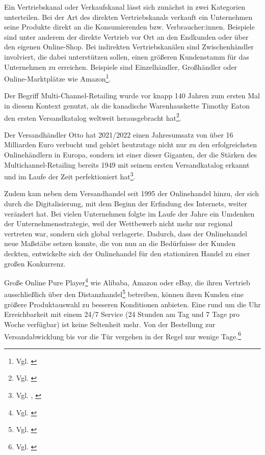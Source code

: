 Ein Vertriebskanal oder Verkaufskanal lässt sich zunächst in zwei Kategorien unterteilen. Bei der Art des direkten Vertriebskanals verkauft ein Unternehmen seine Produkte direkt an die Konsumierenden bzw. Verbraucher:innen. Beispiele sind unter anderem der direkte Vertrieb vor Ort an den Endkunden oder über den eigenen Online-Shop. Bei indirekten Vertriebskanälen sind Zwischenhändler involviert, die dabei unterstützen sollen, einen größeren Kundenstamm für das Unternehmen zu erreichen. Beispiele sind Einzelhändler, Großhändler oder Online-Marktplätze wie Amazon\footnote{Vgl. \autocite [Online] {GisclardBiondi2021}}.
\newline

Der Begriff Multi-Channel-Retailing wurde vor knapp 140 Jahren zum ersten Mal in diesem Kontext genutzt, als die kanadische Warenhauskette Timothy Eaton den ersten Versandkatalog weltweit herausgebracht hat\footnote{Vgl. \autocite [Online] {Santink2015}}.
\newline

Der Versandhändler Otto hat 2021/2022 einen Jahresumsatz von über 16 Milliarden Euro verbucht und gehört heutzutage nicht nur zu den erfolgreichsten Onlinehändlern in Europa, sondern ist einer dieser Giganten, der die Stärken des Multichannel-Retailing bereits 1949 mit seinem ersten Versandkatalog erkannt und im Laufe der Zeit perfektioniert hat\footnote{Vgl. \autocite [Online] {Otto2022}, \autocite [Online] {Rabe2022}}.
\newline

Zudem kam neben dem Versandhandel seit 1995 der Onlinehandel hinzu, der sich durch die Digitalisierung, mit dem Beginn der Erfindung des Internets, weiter verändert hat. Bei vielen Unternehmen folgte im Laufe der Jahre ein Umdenken der Unternehmensstrategie, weil der Wettbewerb nicht mehr nur regional vertreten war, sondern sich global verlagerte. Dadurch, dass der Onlinehandel neue Maßstäbe setzen konnte, die von nun an die Bedürfnisse der Kunden deckten, entwickelte sich der Onlinehandel für den stationären Handel zu einer großen Konkurrenz.
\newline

Große Online Pure Player\footnote{Vgl. \autocite [Online] {Deges2020a}} wie Alibaba, Amazon oder eBay, die ihren Vertrieb ausschließlich über den Distanzhandel\footnote{Vgl. \autocite [Online] {Schneider2018}} betreiben, können ihren Kunden eine größere Produktauswahl zu besseren Konditionen anbieten. Eine rund um die Uhr Erreichbarkeit mit einem 24/7 Service (24 Stunden am Tag und 7 Tage pro Woche verfügbar) ist keine Seltenheit mehr. Von der Bestellung zur Versandabwicklung bis vor die Tür vergehen in der Regel nur wenige Tage.\footnote{Vgl. \autocite [S.17] {Vallee2018}}
\newline

